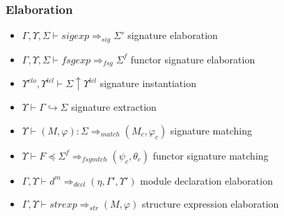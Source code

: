 \documentclass{beamer}
\begin{document}
		\begin{frame}
			\frametitle{Elaboration}
		  	\begin{itemize}
			    \item<1->    $\Gamma,\Upsilon,\Sigma\vdash sigexp \Rightarrow_{sig} \Sigma'$  signature elaboration
			    \item<2->   $\Gamma,\Upsilon,\Sigma\vdash fsgexp \Rightarrow_{fsg} \Sigma^f$  functor signature elaboration
			    \item<3-> $\Upsilon^{clo},\Upsilon^{lcl}\vdash \Sigma \uparrow \Upsilon^{lcl}$  signature instantiation
			    \item<4-> $\Upsilon\vdash\Gamma\hookrightarrow \Sigma$ signature extraction
			    \item<5-> $\Upsilon\vdash(M,\varphi):\Sigma\Rightarrow_{match} (M_c,\varphi_c)$  signature matching
			    \item<6-> $\Upsilon\vdash F \preceq \Sigma^f \Rightarrow_{fsgmtch} (\psi_c, \theta_c)$ functor signature matching
			    \item<7-> $\Gamma,\Upsilon\vdash d^m \Rightarrow_{decl} (\eta,\Gamma',\Upsilon')$  module declaration elaboration
			    \item<8-> $\Gamma,\Upsilon\vdash strexp \Rightarrow_{str} (M, \varphi)$  structure expression elaboration
			\end{itemize}
			
		\end{frame}
\end{document}
